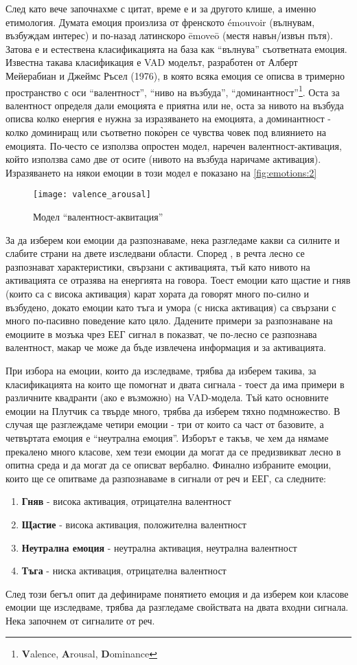 \documentclass[main.tex]{subfiles}
\begin{document}
След като вече започнахме с цитат, време е и за другото клише, а именно етимология. Думата емоция произлиза от френското émouvoir (вълнувам, възбуждам интерес) и по-назад латинскоро ēmoveō (местя навън/извън пътя). Затова е и естествена класификацията на база как ``вълнува'' съответната емоция. Известна такава класификация е VAD моделът, разработен от Алберт Мейерабиан и Джеймс Ръсел (1976), в която всяка емоция се описва в тримерно пространство с оси ``валентност'', ``ниво на възбуда'', ``доминантност''\footnote{\textbf{V}alence, \textbf{A}rousal, \textbf{D}ominance}. Оста за валентност определя дали емоцията е приятна или не, оста за нивото на възбуда описва колко енергия е нужна за изразяването на емоцията, а доминантност - колко доминиращ или съответно пок\`{о}рен се чувства човек под влиянието на емоцията. По-често се използва опростен модел, наречен валентност-активация, който използва само две от осите (нивото на възбуда наричаме активация). Изразяването на някои емоции в този модел е показано на \autoref{fig:emotions:2}
\begin{figure}[ht]%
    \centering
    \texttt{[image: valence\_arousal]}
    \caption{Модел ``валентност-аквитация''}
    \label{fig:emotions:2}
\end{figure}

За да изберем кои емоции да разпознаваме, нека разгледаме какви са силните и слабите страни на двете изследвани области.
Според \cite{survey}, в речта лесно се разпознават характеристики, свързани с активацията, тъй като нивото на активацията се отразява на енергията на говора. Тоест емоции като щастие и гняв (които са с висока активация) карат хората да говорят много по-силно и възбудено, докато емоции като тъга и умора (с ниска активация) са свързани с много по-пасивно поведение като цяло.
Дадените примери за разпознаване на емоциите в мозъка чрез ЕЕГ сигнал в \cite{brain_survey} показват, че по-лесно се разпознава валентност, макар че може да бъде извлечена информация и за активацията.

При избора на емоции, които да изследваме, трябва да изберем такива, за класификацията на които ще помогнат и двата сигнала - тоест да има примери в различните квадранти (ако е възможно) на VAD-модела. Тъй като основните емоции на Плутчик са твърде много, трябва да изберем тяхно подмножество. В случая ще разглеждаме четири емоции - три от които са част от базовите, а четвъртата емоция е ``неутрална емоция''. Изборът е такъв, че хем да нямаме прекалено много класове, хем тези емоции да могат да се предизвикват лесно в опитна среда и да могат да се описват вербално.
Финално избраните емоции, които ще се опитваме да разпознаваме в сигнали от реч и ЕЕГ, са следните:
\begin{enumerate}
    \item \textbf{Гняв} - висока активация, отрицателна валентност
    \item \textbf{Щастие} - висока активация, положителна валентност
    \item \textbf{Неутрална емоция} - неутрална активация, неутрална валентност
    \item \textbf{Тъга} - ниска активация, отрицателна валентност
\end{enumerate}

След този бегъл опит да дефинираме понятието емоция и да изберем кои класове емоции ще изследваме, трябва да разгледаме свойствата на двата входни сигнала. Нека започнем от сигналите от реч. 
\end{document}
